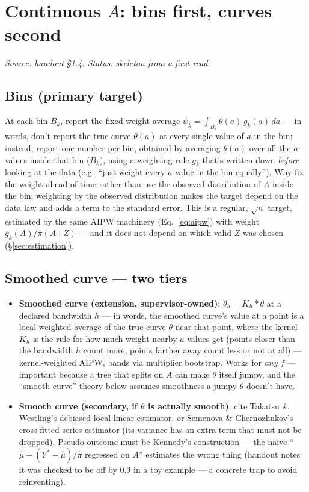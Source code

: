 \section{Continuous \texorpdfstring{$A$}{A}: bins first, curves second}
\label{sec:continuous}

\emph{Source: handout \S1.4. Status: skeleton from a first read.}

\subsection{Bins (primary target)}

At each bin $B_k$, report the fixed-weight average
$\psi_k = \int_{B_k} \theta(a)\, g_k(a)\, da$ --- in words, don't report the
true curve $\theta(a)$ at every single value of $a$ in the bin; instead,
report one number per bin, obtained by averaging $\theta(a)$ over all the
$a$-values inside that bin ($B_k$), using a weighting rule $g_k$ that's
written down \emph{before} looking at the data (e.g.\ ``just weight every
$a$-value in the bin equally''). Why fix the weight ahead of time rather
than use the observed distribution of $A$ inside the bin: weighting by the
observed distribution makes the target depend on the data law and adds a
term to the standard error. This is a regular, $\sqrt{n}$ target, estimated
by the same AIPW machinery (Eq.~\ref{eq:aipw}) with weight
$g_k(A)/\hat\pi(A\mid Z)$ --- and it does not depend on which valid $Z$ was
chosen (\S\ref{sec:estimation}).

\subsection{Smoothed curve --- two tiers}

\begin{itemize}
  \item \textbf{Smoothed curve (extension, supervisor-owned)}:
    $\theta_h = K_h * \theta$ at a declared bandwidth $h$ --- in words, the
    smoothed curve's value at a point is a local weighted average of the
    true curve $\theta$ near that point, where the kernel $K_h$ is the rule
    for how much weight nearby $a$-values get (points closer than the
    bandwidth $h$ count more, points farther away count less or not at
    all) --- kernel-weighted
    AIPW, bands via multiplier bootstrap. Works for \emph{any} $f$ ---
    important because a tree that splits on $A$ can make $\theta$ itself
    jumpy, and the ``smooth curve'' theory below assumes smoothness a jumpy
    $\theta$ doesn't have.
  \item \textbf{Smooth curve (secondary, if $\theta$ is actually smooth)}:
    cite Takatsu \& Westling's debiased local-linear estimator, or Semenova
    \& Chernozhukov's cross-fitted series estimator (its variance has an
    extra term that must not be dropped). Pseudo-outcome must be Kennedy's
    construction --- the naive ``$\hat\mu + (Y^*-\hat\mu)/\hat\pi$ regressed
    on $A$'' estimates the wrong thing (handout notes it was checked to be
    off by $0.9$ in a toy example --- a concrete trap to avoid
    reinventing).
\end{itemize}


